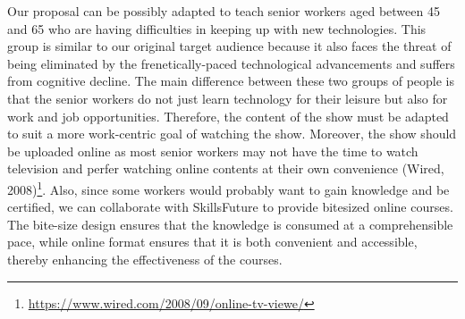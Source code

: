 \documentclass[a4paper,12pt]{article}
\begin{document}
Our proposal can be possibly adapted to teach senior workers aged between 45 and 65 who are having difficulties in keeping up with new technologies. This group is similar to our original target audience because it also faces the threat of being eliminated by the frenetically-paced technological advancements and suffers from cognitive decline. The main difference between these two groups of people is that the senior workers do not just learn technology for their leisure but also for work and job opportunities. Therefore, the content of the show must be adapted to suit a more work-centric goal of watching the show. Moreover, the show should be uploaded online as most senior workers may not have the time to watch television and perfer watching online contents at their own convenience (Wired, 2008)\footnote{\url{https://www.wired.com/2008/09/online-tv-viewe/}}. Also, since some workers would probably want to gain knowledge and be certified, we can collaborate with SkillsFuture to provide bitesized online courses. The bite-size design ensures that the knowledge is consumed at a comprehensible pace, while online format ensures that it is both convenient and accessible, thereby enhancing the effectiveness of the courses.
\end{document}
